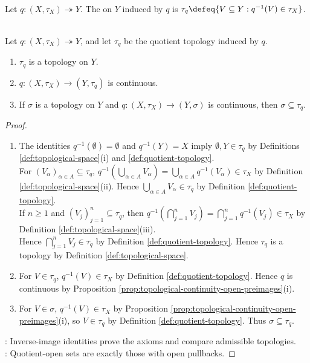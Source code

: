 \begin{definition} \label{def:quotient-topology} \\
Let $q:(X,\tau_X)\twoheadrightarrow Y$. The  on $Y$ induced by $q$ is $\tau_q\defeq\{V\subseteq Y:q^{-1}(V)\in\tau_X\}$.
\end{definition}

\begin{proposition} \label{prop:quotient-collection-is-topology} \\
Let $q:(X,\tau_X)\twoheadrightarrow Y$, and let $\tau_q$ be the quotient topology induced by $q$.
\begin{enumerate}[label=(\roman*)]
\setlength{\itemsep}{0pt}
\item $\tau_q$ is a topology on $Y$.
\item $q:(X,\tau_X)\to(Y,\tau_q)$ is continuous.
\item If $\sigma$ is a topology on $Y$ and $q:(X,\tau_X)\to(Y,\sigma)$ is continuous, then $\sigma\subseteq\tau_q$.
\end{enumerate}
\begin{proof}
\begin{enumerate}[label=(\roman*)]
\setlength{\itemsep}{0pt}
\item The identities $q^{-1}(\emptyset)=\emptyset$ and $q^{-1}(Y)=X$ imply $\emptyset,Y\in\tau_q$ by Definitions \ref{def:topological-space}(i) and \ref{def:quotient-topology}.\\
For $(V_\alpha)_{\alpha\in A}\subseteq\tau_q$, $q^{-1}(\bigcup\limits_{\alpha\in A}V_\alpha)=\bigcup\limits_{\alpha\in A}q^{-1}(V_\alpha)\in\tau_X$ by Definition \ref{def:topological-space}(ii). Hence $\bigcup\limits_{\alpha\in A}V_\alpha\in\tau_q$ by Definition \ref{def:quotient-topology}.\\
If $n\geq1$ and $(V_j)_{j=1}^n\subseteq\tau_q$, then $q^{-1}(\bigcap\limits_{j=1}^nV_j)=\bigcap\limits_{j=1}^nq^{-1}(V_j)\in\tau_X$ by Definition \ref{def:topological-space}(iii).\\
Hence $\bigcap\limits_{j=1}^nV_j\in\tau_q$ by Definition \ref{def:quotient-topology}. Hence $\tau_q$ is a topology by Definition \ref{def:topological-space}.
\item For $V\in\tau_q$, $q^{-1}(V)\in\tau_X$ by Definition \ref{def:quotient-topology}. Hence $q$ is continuous by Proposition \ref{prop:topological-continuity-open-preimages}(i).
\item For $V\in\sigma$, $q^{-1}(V)\in\tau_X$ by Proposition \ref{prop:topological-continuity-open-preimages}(i), so $V\in\tau_q$ by Definition \ref{def:quotient-topology}. Thus $\sigma\subseteq\tau_q$.
\end{enumerate}
: Inverse-image identities prove the axioms and compare admissible topologies.\\
: Quotient-open sets are exactly those with open pullbacks.
\end{proof}
\end{proposition}

